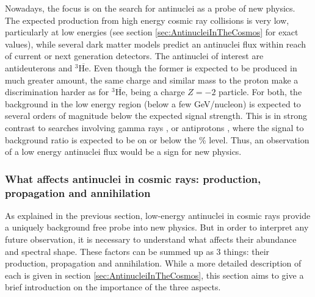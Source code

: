 Nowadays, the focus is on the search for antinuclei as a probe of new physics. The expected production from high energy cosmic ray collisions is very low, particularly at low energies (see section \ref{sec:AntinucleiInTheCosmos} for exact values), while several dark matter models predict an antinuclei flux within reach of current or next generation detectors\cite{Doetinchem_2020_review}. The antinuclei of interest are antideuterons and $^3\overline{\mathrm{He}}$. Even though the former is expected to be produced in much greater amount, the same charge and similar mass to the proton make a discrimination harder as for $^3\overline{\mathrm{He}}$, being a charge $Z=-2$ particle. For both, the background in the low energy region (below a few GeV/nucleon) is expected to several orders of magnitude below the expected signal strength. This is in strong contrast to searches involving gamma rays \cite{}, or antiprotons \cite{}, where the signal to background ratio is expected to be on or below the \% level. Thus, an observation of a low energy antinuclei flux would be a sign for new physics. 

\subsubsection{ What affects antinuclei in cosmic rays: production, propagation and annihilation}
As explained in the previous section, low-energy antinuclei in cosmic rays provide a uniquely background free probe into new physics. But in order to interpret any future observation, it is necessary to understand what affects their abundance and spectral shape. These factors can be summed up as 3 things: their production, propagation and annihilation. While a more detailed description of each is given in section \ref{sec:AntinucleiInTheCosmos}, this section aims to give a brief introduction on the importance of the three aspects. \\

